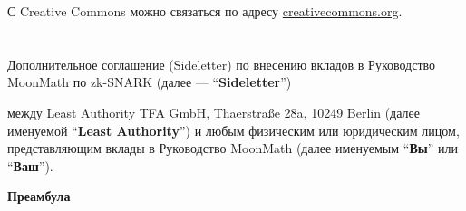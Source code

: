 С Creative Commons можно связаться по адресу \href{creativecommons.org}{creativecommons.org}.

\chapter*{ }
\label{chapter:contrib}

\begin{center}\Large 
Дополнительное соглашение (Sideletter) по внесению вкладов в Руководство MoonMath по zk-SNARK (далее --- ``\textbf{Sideletter}'')
\end{center}\label{sideletter}

между Least Authority TFA GmbH, Thaerstraße 28a, 10249 Berlin (далее именуемой ``\textbf{Least Authority}'') и любым физическим или юридическим лицом, представляющим вклады в Руководство MoonMath (далее именуемым ``\textbf{Вы}'' или ``\textbf{Ваш}''). 
\begin{center}\bfseries
Преамбула
\end{center}
